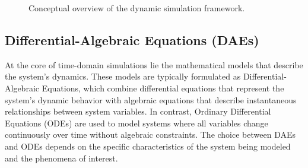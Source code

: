 \begin{figure}[htbp]
\centering
{}
\caption{Conceptual overview of the dynamic simulation framework.}
\label{fig:framework_overview}
\end{figure}



\subsection{Differential-Algebraic Equations (DAEs)}

At the core of time-domain simulations lie the mathematical models that describe the system's dynamics. These models are typically formulated as Differential-Algebraic Equations,
 which combine differential equations that represent the system's dynamic behavior with algebraic equations that describe instantaneous relationships between system variables. 
In contrast, Ordinary Differential Equations (ODEs) are used to model systems where all variables change continuously over time without algebraic constraints. 
The choice between DAEs and ODEs depends on the specific characteristics of the system being modeled and the phenomena of interest.

